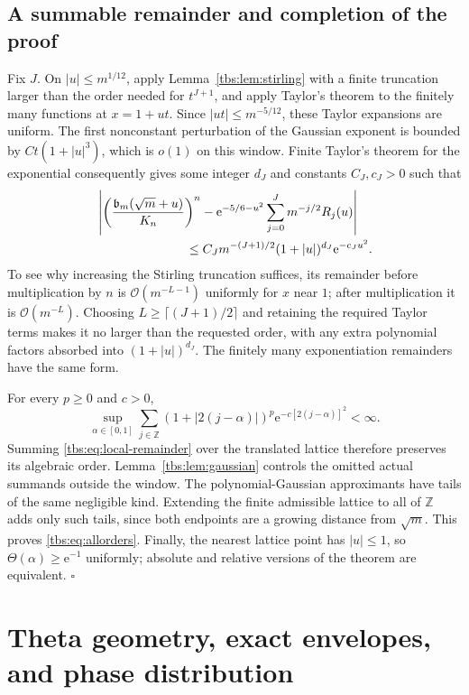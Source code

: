\documentclass[11pt,a4paper]{article}
\numberwithin{equation}{section}
\theoremstyle{definition}
\newcommand{\Z}{\mathbb Z}
\newcommand{\bcont}{\mathfrak b}
\newcommand{\ee}{\mathrm e}
\newcommand{\OO}{\mathcal O}
\begin{document}
\subsection{A summable remainder and completion of the proof}
Fix $J$. On $|u|\le m^{1/12}$, apply Lemma~\ref{tbs:lem:stirling} with a
finite truncation larger than the order needed for $t^{J+1}$, and apply
Taylor's theorem to the finitely many functions at $x=1+ut$. Since
$|ut|\le m^{-5/12}$, these Taylor expansions are uniform. The first
nonconstant perturbation of the Gaussian exponent is bounded by
$C t(1+|u|^3)$, which is $o(1)$ on this window. Finite Taylor's theorem
for the exponential consequently gives some integer $d_J$ and constants
$C_J,c_J>0$ such that
\begin{align}\label{tbs:eq:local-remainder}
 &\left|\left(\frac{\bcont_m(\sqrt m+u)}{K_n}\right)^n
 -\ee^{-5/6-u^2}\sum_{j=0}^Jm^{-j/2}R_j(u)\right|\notag\\
 &\hspace{25mm}\le C_Jm^{-(J+1)/2}(1+|u|)^{d_J}\ee^{-c_Ju^2}.
\end{align}
To see why increasing the Stirling truncation suffices, its remainder
before multiplication by $n$ is $\OO(m^{-L-1})$ uniformly for $x$ near
$1$; after multiplication it is $\OO(m^{-L})$. Choosing
$L\ge\lceil(J+1)/2\rceil$ and retaining the required Taylor terms makes
it no larger than the requested order, with any extra polynomial factors
absorbed into $(1+|u|)^{d_J}$. The finitely many exponentiation remainders
have the same form.

For every $p\ge0$ and $c>0$,
\[
 \sup_{\alpha\in[0,1]}
 \sum_{j\in\Z}(1+|2(j-\alpha)|)^p\ee^{-c[2(j-\alpha)]^2}<\infty.
\]
Summing \eqref{tbs:eq:local-remainder} over the translated lattice therefore
preserves its algebraic order. Lemma~\ref{tbs:lem:gaussian} controls the
omitted actual summands outside the window. The polynomial-Gaussian
approximants have tails of the same negligible kind. Extending the
finite admissible lattice to all of $\Z$ adds only such tails, since both
endpoints are a growing distance from $\sqrt m$. This proves
\eqref{tbs:eq:allorders}. Finally, the nearest lattice point has $|u|\le1$,
so $\Theta(\alpha)\ge\ee^{-1}$ uniformly; absolute and relative versions
of the theorem are equivalent. \hfill$\square$

\section{Theta geometry, exact envelopes, and phase distribution}\label{tbs:sec:theta}
\end{document}
